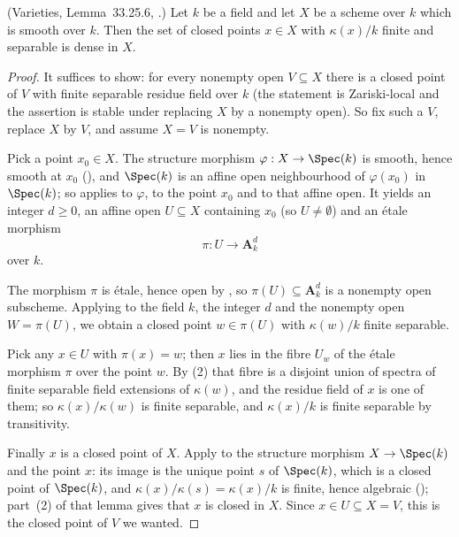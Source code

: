 \begin{lemma}
\label{lem:pc-dense-separable-points}
(Varieties, Lemma~33.25.6,
.)
Let $k$ be a field and let $X$ be a scheme over $k$ which is smooth
over $k$.  Then the set of closed points $x\in X$ with $\kappa(x)/k$
finite and separable is dense in $X$.
\end{lemma}
\begin{proof}
It suffices to show: for every nonempty open $V\subseteq X$ there is a
closed point of $V$ with finite separable residue field over $k$ (the
statement is Zariski-local and the assertion is stable under replacing
$X$ by a nonempty open).  So fix such a $V$, replace $X$ by $V$, and
assume $X=V$ is nonempty.

Pick a point $x_0\in X$.  The structure morphism
$\varphi:X\to\Spec(k)$ is smooth, hence smooth at $x_0$
(), and $\Spec(k)$ is an affine open
neighbourhood of $\varphi(x_0)$ in $\Spec(k)$; so
 applies to $\varphi$, to
the point $x_0$ and to that affine open.  It yields an integer $d\ge0$,
an affine open $U\subseteq X$ containing $x_0$ (so $U\neq\emptyset$)
and an \'etale morphism
\[
\pi:U\longrightarrow\mathbf A^d_k
\]
over $k$.

The morphism $\pi$ is \'etale, hence open by
, so $\pi(U)\subseteq\mathbf A^d_k$ is a
nonempty open subscheme.  Applying
 to the field $k$, the
integer $d$ and the nonempty open $W=\pi(U)$, we obtain a closed point
$w\in\pi(U)$ with $\kappa(w)/k$ finite separable.

Pick any $x\in U$ with $\pi(x)=w$; then $x$ lies in the fibre $U_w$ of
the \'etale morphism $\pi$ over the point $w$.  By
(2) that fibre is a disjoint union
of spectra of finite separable field extensions of $\kappa(w)$, and the
residue field of $x$ is one of them; so $\kappa(x)/\kappa(w)$ is finite
separable, and $\kappa(x)/k$ is finite separable by transitivity.

Finally $x$ is a closed point of $X$.  Apply
 to the structure morphism
$X\to\Spec(k)$ and the point $x$: its image is the unique point $s$ of
$\Spec(k)$, which is a closed point of $\Spec(k)$, and
$\kappa(x)/\kappa(s)=\kappa(x)/k$ is finite, hence algebraic
(); part~(2) of that lemma gives that $x$ is
closed in $X$.  Since $x\in U\subseteq X=V$, this is the closed point
of $V$ we wanted.
\end{proof}


